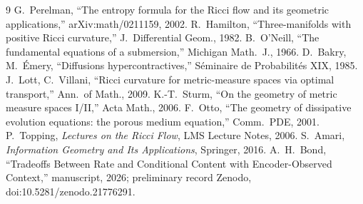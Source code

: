 \documentclass[11pt]{article}
\begin{document}
\begin{thebibliography}{9}\small
{} G.\ Perelman, ``The entropy formula for the Ricci flow and its
geometric applications,'' arXiv:math/0211159, 2002.
 R.\ Hamilton, ``Three-manifolds with positive Ricci
curvature,'' J.\ Differential Geom., 1982.
 B.\ O'Neill, ``The fundamental equations of a submersion,''
Michigan Math.\ J., 1966.
 D.\ Bakry, M.\ \'Emery, ``Diffusions hypercontractives,''
S\'eminaire de Probabilit\'es XIX, 1985.
 J.\ Lott, C.\ Villani, ``Ricci curvature for
metric-measure spaces via optimal transport,'' Ann.\ of Math., 2009.
 K.-T.\ Sturm, ``On the geometry of metric measure spaces I/II,''
Acta Math., 2006.
 F.\ Otto, ``The geometry of dissipative evolution equations: the
porous medium equation,'' Comm.\ PDE, 2001.
 P.\ Topping, \emph{Lectures on the Ricci Flow}, LMS Lecture
Notes, 2006.
 S.\ Amari, \emph{Information Geometry and Its Applications},
Springer, 2016.
 A.\ H.\ Bond, ``Tradeoffs Between Rate and Conditional Content
with Encoder-Observed Context,'' manuscript, 2026; preliminary record Zenodo,
doi:10.5281/zenodo.21776291.
\end{thebibliography}
\end{document}
